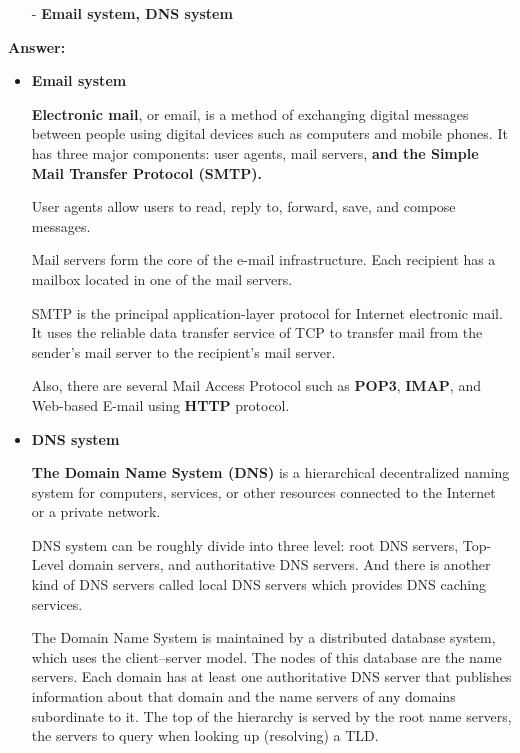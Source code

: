 \begin{enumerate}
    \begin{itemize}
        \item [-] \textbf{Email system, DNS system}
    \end{itemize}
    
    \textbf{Answer:}
    
    \begin{itemize}
        \item \textbf{Email system}
        
        \textbf{Electronic mail}, or email, is a method of exchanging digital messages between people using digital devices such as computers and mobile phones.
        It has three major components: user agents, mail servers, \textbf{and the Simple Mail Transfer Protocol (SMTP).}
        
        User agents allow users to read, reply to, forward, save, and compose messages.
        
        Mail servers form the core of the e-mail infrastructure. Each recipient has a mailbox located in one of the mail servers.
        
        SMTP is the principal application-layer protocol for Internet electronic mail. It uses the reliable data transfer service of TCP to transfer mail from the sender’s mail server to the recipient’s mail server.
        
        Also, there are several Mail Access Protocol such as \textbf{POP3}, \textbf{IMAP}, and Web-based E-mail using \textbf{HTTP} protocol.
        
        \item \textbf{DNS system}
        
        \textbf{The Domain Name System (DNS)} is a hierarchical decentralized naming system for computers, services, or other resources connected to the Internet or a private network.
        
        DNS system can be roughly divide into three level: root DNS servers, Top-Level domain servers, and authoritative DNS servers. And there is another kind of DNS servers called local DNS servers which provides DNS caching services.
        
        The Domain Name System is maintained by a distributed database system, which uses the client–server model. The nodes of this database are the name servers. Each domain has at least one authoritative DNS server that publishes information about that domain and the name servers of any domains subordinate to it. The top of the hierarchy is served by the root name servers, the servers to query when looking up (resolving) a TLD.
    \end{itemize}
    

\end{enumerate}

